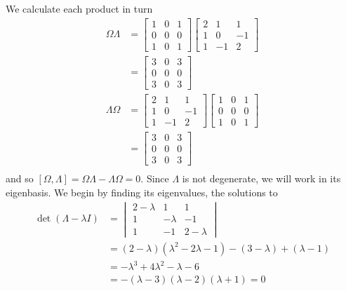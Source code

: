 \documentclass[../principles-of-quantum-mechanics.tex]{subfiles}
\begin{document}
\begin{questions}
\begin{solution}
	We calculate each product in turn
	\begin{align*}
		\Omega\Lambda &= \begin{bmatrix}1 & 0 & 1 \\ 0 & 0 & 0 \\ 1 & 0 & 1\end{bmatrix}\begin{bmatrix}2 & 1 & 1 \\ 1 & 0 & -1 \\ 1 & -1 & 2\end{bmatrix} \\
		&= \begin{bmatrix}3 & 0 & 3 \\ 0 & 0 & 0 \\ 3 & 0 & 3\end{bmatrix} \\
		\Lambda\Omega &= \begin{bmatrix}2 & 1 & 1 \\ 1 & 0 & -1 \\ 1 & -1 & 2\end{bmatrix}\begin{bmatrix}1 & 0 & 1 \\ 0 & 0 & 0 \\ 1 & 0 & 1\end{bmatrix} \\
		&= \begin{bmatrix}3 & 0 & 3 \\ 0 & 0 & 0 \\ 3 & 0 & 3\end{bmatrix} \\
	\end{align*}
	and so $[\Omega, \Lambda] = \Omega\Lambda - \Lambda\Omega = 0$. Since $\Lambda$ is not degenerate, we will work in its eigenbasis. We begin by finding its eigenvalues, the solutions to
	\begin{align*}
		\det(\Lambda - \lambda{I}) &= \begin{vmatrix}2 - \lambda & 1 & 1 \\ 1 & -\lambda & -1 \\ 1 & -1 & 2 - \lambda\end{vmatrix} \\
		&= (2-\lambda)(\lambda^2 - 2\lambda - 1) - (3-\lambda) + (\lambda - 1) \\
		&= -\lambda^3 + 4\lambda^2 - \lambda - 6 \\
		&= -(\lambda-3)(\lambda-2)(\lambda+1) = 0
	\end{align*}

\end{solution}
\end{questions}
\end{document}
